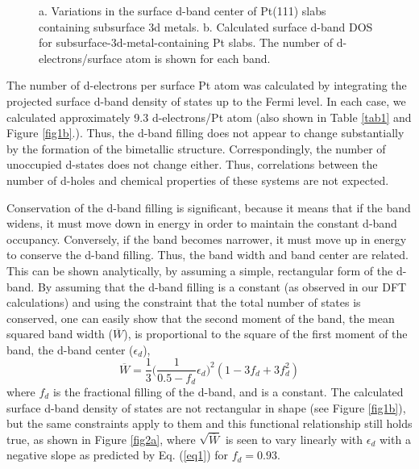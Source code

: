 \documentclass[aps,preprint,superscriptaddress,endfloats*]{revtex4}
\begin{document}
\begin{figure}
\caption{a. Variations in the surface d-band center of Pt(111) slabs
  containing subsurface 3d metals. b. Calculated surface d-band DOS for
  subsurface-3d-metal-containing Pt slabs.  The number of
  d-electrons/surface atom is shown for each band.\label{fig1}}
\end{figure}

The number of d-electrons per surface Pt atom was calculated by
integrating the projected surface d-band density of states up to the
Fermi level.  In each case, we calculated approximately 9.3
d-electrons/Pt atom (also shown in Table \ref{tab1} and Figure
\ref{fig1b}.).  Thus, the d-band filling does not appear to change
substantially by the formation of the bimetallic structure.
Correspondingly, the number of unoccupied d-states does not change
either. Thus, correlations between the number of d-holes and chemical
properties of these systems are not expected.  

Conservation of the d-band filling is significant, because it means
that if the band widens, it must move down in energy in order to
maintain the constant d-band occupancy.  Conversely, if the band becomes
narrower, it must move up in energy to conserve the d-band filling.
Thus, the band width and band center are related.  This can be shown
analytically, by assuming a simple, rectangular form of
the d-band.  By assuming that the d-band filling is a constant (as
observed in our DFT calculations) and using the constraint that the
total number of states is conserved, one can easily show that the
second moment of the band, the mean squared band width
($\overline{W}$), is proportional to the square of the first moment of
the band, the d-band center ($\epsilon_d$),
\begin{equation}\label{eq1}
\overline{W} = \frac{1}{3}\biggl(\frac{1}{0.5 -f_d} \epsilon_d\biggr)^2(1-3f_d+3f_d^2)
\end{equation}
where $f_d$ is the fractional filling of the d-band, and is a
constant.  The calculated surface d-band density of states are not
rectangular in shape (see Figure \ref{fig1b}), but the same
constraints apply to them and this functional relationship still holds
true, as shown in Figure \ref{fig2a}, where $\sqrt{\overline{W}}$ is
seen to vary linearly with $\epsilon_d$ with a negative slope as
predicted by Eq.  (\ref{eq1}) for $f_d=0.93$.
\end{document}
